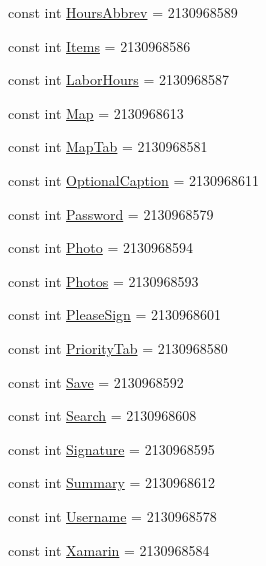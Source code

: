 \begin{DoxyCompactItemize}
\item 
const int \hyperlink{class_field_service_1_1_android_1_1_resource_1_1_string_a33d7d7eb17e30e55329cd9dbd7f69ca6}{Hours\+Abbrev} = 2130968589
\item 
const int \hyperlink{class_field_service_1_1_android_1_1_resource_1_1_string_a505cfaa223d3d4ca9dcee1a97bedca23}{Items} = 2130968586
\item 
const int \hyperlink{class_field_service_1_1_android_1_1_resource_1_1_string_a4c79d6048bc64145726b7e4b6363b1fc}{Labor\+Hours} = 2130968587
\item 
const int \hyperlink{class_field_service_1_1_android_1_1_resource_1_1_string_a9ce458428c1920d273ac07ea680f1d42}{Map} = 2130968613
\item 
const int \hyperlink{class_field_service_1_1_android_1_1_resource_1_1_string_a3720f6b6f00c62eded260455648922c6}{Map\+Tab} = 2130968581
\item 
const int \hyperlink{class_field_service_1_1_android_1_1_resource_1_1_string_ae0ec1547066e58595c967c86f9669737}{Optional\+Caption} = 2130968611
\item 
const int \hyperlink{class_field_service_1_1_android_1_1_resource_1_1_string_afd1f58df5c2587de483e411cb4eb6072}{Password} = 2130968579
\item 
const int \hyperlink{class_field_service_1_1_android_1_1_resource_1_1_string_a26e9cbeb6613ffccc309b9f9862e30cf}{Photo} = 2130968594
\item 
const int \hyperlink{class_field_service_1_1_android_1_1_resource_1_1_string_a8e3db72a9ef250db5e972a41c5e6c3e4}{Photos} = 2130968593
\item 
const int \hyperlink{class_field_service_1_1_android_1_1_resource_1_1_string_affc71a1bed2ddad57a97fda1de7e887d}{Please\+Sign} = 2130968601
\item 
const int \hyperlink{class_field_service_1_1_android_1_1_resource_1_1_string_af18f692da3698e0abd45cbc16098c1e8}{Priority\+Tab} = 2130968580
\item 
const int \hyperlink{class_field_service_1_1_android_1_1_resource_1_1_string_aab785915a296f9ca4b06d7b4c992568a}{Save} = 2130968592
\item 
const int \hyperlink{class_field_service_1_1_android_1_1_resource_1_1_string_a8e59ac1c2d4b1fe743743e694c281dc2}{Search} = 2130968608
\item 
const int \hyperlink{class_field_service_1_1_android_1_1_resource_1_1_string_ac2cf2805cb99d034d428f3449913ab7e}{Signature} = 2130968595
\item 
const int \hyperlink{class_field_service_1_1_android_1_1_resource_1_1_string_ad8169afe48a2e18ba0eeffc3c49b8981}{Summary} = 2130968612
\item 
const int \hyperlink{class_field_service_1_1_android_1_1_resource_1_1_string_ae35f91a7ed1b3b82ed277c98f70586a4}{Username} = 2130968578
\item 
const int \hyperlink{class_field_service_1_1_android_1_1_resource_1_1_string_ae01b3c3e3cd9182586321568305268b1}{Xamarin} = 2130968584
\end{DoxyCompactItemize}


